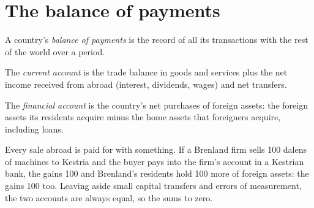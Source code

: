\section{The balance of payments}\label{sec:g12:exchange-rates-and-balance-of-payments:bop}

\begin{definition}\label{def:g12:exchange-rates-and-balance-of-payments:bop}
A country's \emph{balance of payments} is the record of all its transactions with the rest of the world over a period.
\end{definition}

\begin{definition}\label{def:g12:exchange-rates-and-balance-of-payments:current-account}
The \emph{current account} is the trade balance in goods and services plus the net income received from abroad (interest, dividends, wages) and net
transfers.
\end{definition}

\begin{definition}\label{def:g12:exchange-rates-and-balance-of-payments:financial-account}
The \emph{financial account} is the country's net purchases of foreign assets: the foreign assets its residents acquire minus the home assets that
foreigners acquire, including loans.
\end{definition}

Every sale abroad is paid for with something. If a Brenland firm sells 100 dalens of machines to Kestria and the buyer pays into the firm's account in a Kestrian bank, the
 gains 100 and Brenland's residents hold 100 more of foreign assets: the  gains 100 too. Leaving aside small capital transfers and errors of
measurement, the two accounts are always equal, so the  sums to zero.

